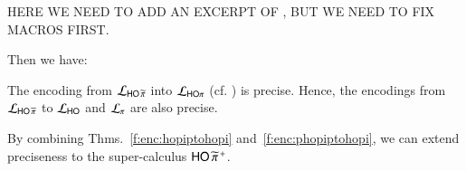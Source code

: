 HERE WE NEED TO ADD AN EXCERPT OF , BUT WE NEED TO FIX MACROS FIRST.

Then we have:

\begin{theorem}
	\label{f:enc:phopiptohopi}
	The encoding from
		$\mathcal{L}_{\mathsf{HO}\,{\widetilde{\pi}}}$ into $\mathcal{L}_{\mathsf{HO}\pi}$ (cf. )
	is precise. 
	Hence, the encodings 
	from
	$\mathcal{L}_{\mathsf{HO}\,{\widetilde{\pi}}}$ to $\mathcal{L}_{\mathsf{HO}}$ 
	and $\mathcal{L}_{\pi}$ 
	are also precise. 
\end{theorem}
By combining Thms.~\ref{f:enc:hopiptohopi} and~\ref{f:enc:phopiptohopi},
we can extend preciseness to the super-calculus
$\mathsf{HO}\,{\widetilde{\pi}}^{\,+}$.




